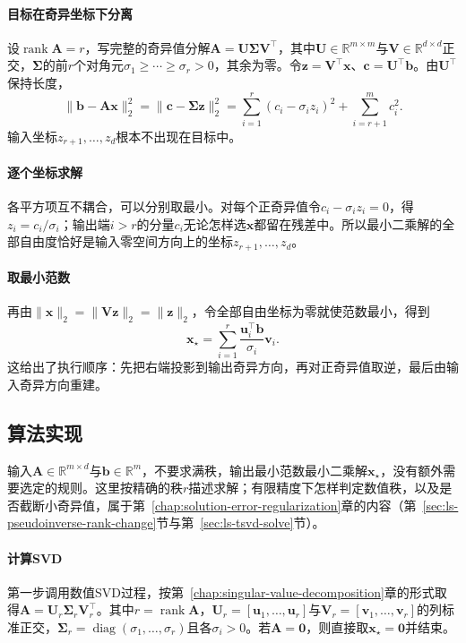 \paragraph{目标在奇异坐标下分离}
设$\operatorname{rank}\bm A=r$，写完整的奇异值分解$\bm A=\bm U\bm\Sigma\bm V^\top$，其中$\bm U\in\mathbb R^{m\times m}$与$\bm V\in\mathbb R^{d\times d}$正交，$\bm\Sigma$的前$r$个对角元$\sigma_1\geq\cdots\geq\sigma_r>0$，其余为零。令$\bm z=\bm V^\top\bm x$、$\bm c=\bm U^\top\bm b$。由$\bm U^\top$保持长度，
\[
 \lVert\bm b-\bm A\bm x\rVert_2^2=\lVert\bm c-\bm\Sigma\bm z\rVert_2^2
 =\sum_{i=1}^r(c_i-\sigma_iz_i)^2+\sum_{i=r+1}^mc_i^2 .
\]
输入坐标$z_{r+1},\ldots,z_d$根本不出现在目标中。

\paragraph{逐个坐标求解}
各平方项互不耦合，可以分别取最小。对每个正奇异值令$c_i-\sigma_iz_i=0$，得$z_i=c_i/\sigma_i$；输出端$i>r$的分量$c_i$无论怎样选$\bm x$都留在残差中。所以最小二乘解的全部自由度恰好是输入零空间方向上的坐标$z_{r+1},\ldots,z_d$。

\paragraph{取最小范数}
再由$\lVert\bm x\rVert_2=\lVert\bm V\bm z\rVert_2=\lVert\bm z\rVert_2$，令全部自由坐标为零就使范数最小，得到
\[
 \bm x_\star=\sum_{i=1}^r\frac{\bm u_i^\top\bm b}{\sigma_i}\bm v_i .
\]
这给出了执行顺序：先把右端投影到输出奇异方向，再对正奇异值取逆，最后由输入奇异方向重建。

\subsection{算法实现}

输入$\bm A\in\mathbb R^{m\times d}$与$\bm b\in\mathbb R^m$，不要求满秩，输出最小范数最小二乘解$\bm x_\star$，没有额外需要选定的规则。这里按精确的秩$r$描述求解；有限精度下怎样判定数值秩，以及是否截断小奇异值，属于第~\ref{chap:solution-error-regularization}章的内容（第~\ref{sec:ls-pseudoinverse-rank-change}节与第~\ref{sec:ls-tsvd-solve}节）。

\paragraph{计算SVD}
第一步调用数值SVD过程，按第~\ref{chap:singular-value-decomposition}章的形式取得$\bm A=\bm U_r\bm\Sigma_r\bm V_r^\top$。其中$r=\operatorname{rank}\bm A$，$\bm U_r=[\bm u_1,\ldots,\bm u_r]$与$\bm V_r=[\bm v_1,\ldots,\bm v_r]$的列标准正交，$\bm\Sigma_r=\operatorname{diag}(\sigma_1,\ldots,\sigma_r)$且各$\sigma_i>0$。若$\bm A=\bm0$，则直接取$\bm x_\star=\bm0$并结束。

